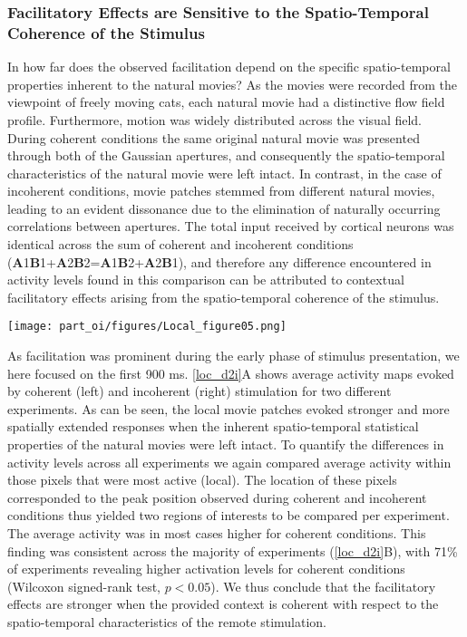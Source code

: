 \subsubsection{Facilitatory Effects are Sensitive to the Spatio-Temporal
Coherence of the Stimulus}

In how far does the observed facilitation depend on the specific
spatio-temporal properties inherent to the natural movies? As the movies
were recorded from the viewpoint of freely moving cats, each natural movie
had a distinctive flow field profile. Furthermore, motion was widely
distributed across the visual field. During coherent conditions the same
original natural movie was presented through both of the Gaussian
apertures, and consequently the spatio-temporal characteristics of the
natural movie were left intact. In contrast, in the case of incoherent
conditions, movie patches stemmed from different natural movies, leading to
an evident dissonance due to the elimination of naturally occurring
correlations between apertures. The total input
received by cortical neurons was identical across the sum of coherent and
incoherent conditions
(\textbf{A}1\textbf{B}1+\textbf{A}2\textbf{B}2=\textbf{A}1\textbf{B}2+\textbf{A}2\textbf{B}1),
and therefore any difference encountered in activity levels found in this
comparison can be attributed to contextual facilitatory effects arising
from the spatio-temporal coherence of the stimulus.

\newpage

\begin{SCfigure}[50][!htb]

\texttt{[image: part\_oi/figures/Local\_figure05.png]}
\caption[Magnitude of Facilitation Depends on Stimulus Coherence.]{\protect}
\label{loc_d2i}\end{SCfigure} 

As facilitation was prominent during the early phase of stimulus
presentation, we here focused on the first 900 ms. \ref{loc_d2i}A shows average
activity maps evoked by coherent (left) and incoherent (right) stimulation
for two different experiments. As can be seen, the local movie patches
evoked stronger and more spatially extended responses when the inherent
spatio-temporal statistical properties of the natural movies were left
intact. To quantify the differences in activity levels across all
experiments we again compared average activity within those pixels that
were most active (local). The location of these pixels corresponded to the
peak position observed during coherent and incoherent conditions thus
yielded two regions of interests to be compared per experiment. The average
activity was in most cases higher for coherent conditions. This finding was
consistent across the majority of experiments (\ref{loc_d2i}B), with 71\%
of experiments revealing higher activation levels for coherent conditions
(Wilcoxon signed-rank test, $p < 0.05$). We thus conclude that the
facilitatory effects are stronger when the provided context is coherent
with respect to the spatio-temporal characteristics of the remote
stimulation.

